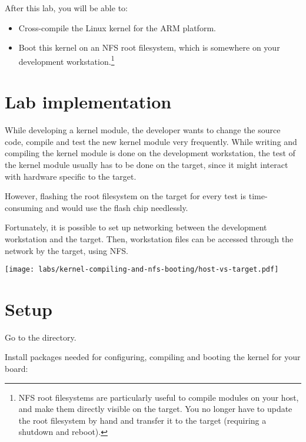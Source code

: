 
After this lab, you will be able to:
\begin{itemize}

\item Cross-compile the Linux kernel for the ARM platform.

\item Boot this kernel on an NFS root filesystem, which is somewhere
on your development workstation.\footnote{NFS root filesystems are
particularly useful to compile modules on your host, and make them
directly visible on the target. You no longer have to update the root
filesystem by hand and transfer it to the target (requiring a shutdown
and reboot).}

\end{itemize}

\section{Lab implementation}

While developing a kernel module, the developer wants to change the
source code, compile and test the new kernel module very
frequently. While writing and compiling the kernel module is done on the
development workstation, the test of the kernel module usually has to
be done on the target, since it might interact with hardware specific
to the target.

However, flashing the root filesystem on the target for every test is
time-consuming and would use the flash chip needlessly.

Fortunately, it is possible to set up networking between the
development workstation and the target. Then, workstation files can be
accessed through the network by the target, using NFS.

\begin{center}
\texttt{[image: labs/kernel-compiling-and-nfs-booting/host-vs-target.pdf]}
\end{center}

\section{Setup}

Go to the  directory.

Install packages needed for configuring, compiling and booting
the kernel for your board:

